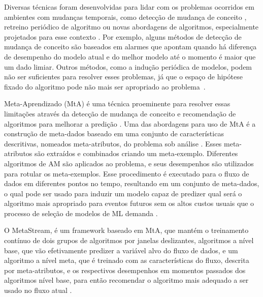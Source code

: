 Diversas técnicas foram desenvolvidas para lidar com os problemas ocorridos em ambientes com mudanças
temporais, como detecção de mudança de conceito
\cite{klinkenberg2000detecting}, retreino periódico de algoritmo
\cite{bifet2007learning} ou novas abordagens de algoritmos, especialmente
projetados para esse contexto \cite{zang2014comparative}. Por exemplo, alguns
métodos de detecção de mudança de conceito \cite{gama2010knowledge} são
baseados em alarmes que apontam quando há diferença de desempenho do modelo
atual e do melhor modelo até o momento é maior que um dado limiar. Outros métodos,
como a indução periódica de modelos, podem não ser suficientes para resolver
esses problemas, já que o espaço de hipótese fixado do algoritmo pode não mais
ser apropriado ao problema~\cite{rossi2014metastream}.

Meta-Aprendizado (MtA) é uma técnica proeminente para resolver essas limitações
através da detecção de mudança de conceito e recomendação de algoritmos para
melhorar a predição \cite{Anderson2019,VanRijn2016,Zarmehri2015}. Uma das abordagens para uso de MtA é a construção de meta-dados \cite{Vanschoren2018} baseado em uma
conjunto de características descritivas, nomeados meta-atributos, do problema
sob análise \cite{Rivolli2018}. Esses meta-atributos são extraídos e combinados
criando um meta-exemplo. Diferentes algoritmos de AM são aplicados ao problema,
e seus desempenhos são utilizados para rotular os meta-exemplos. Esse
procedimento é executado para o fluxo de dados em diferentes pontos no tempo,
resultando em um conjunto de meta-dados, o qual pode ser usado para induzir um
modelo capaz de predizer qual será o algoritmo mais apropriado para eventos
futuros sem os altos custos usuais que o processo de seleção de modelos de ML
demanda \cite{Munoz2018}.

O MetaStream, é um framework baseado em MtA, que mantém o treinamento contínuo de dois grupos de algoritmos por janelas deslizantes, algoritmos a nível base, que vão efetivamente predizer a variável alvo do fluxo de dados, e um algoritmo a nível meta, que é treinado com as características do fluxo, descrita por meta-atributos, e os respectivos desempenhos em momentos passados dos algoritmos nível base, para então recomendar o algoritmo mais adequado a ser usado no fluxo atual \cite{rossi2012, rossi2014metastream}.

